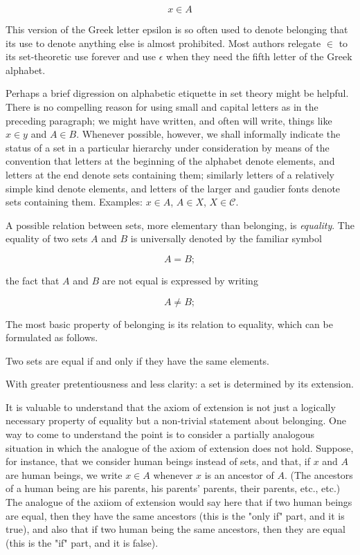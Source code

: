 \begin{equation*}
x \in A
\end{equation*}

This version of the Greek letter epsilon is so often used to denote belonging that its use to denote anything else is almost prohibited. Most authors relegate $\in$ to its set-theoretic use forever and use $\epsilon$ when they need the fifth letter of the Greek alphabet. 

Perhaps a brief digression on alphabetic etiquette in set theory might be helpful. There is no compelling reason for using small and capital letters as in the preceding paragraph; we might have written, and often will write, things like $x \in y$ and $A \in B$. Whenever possible, however, we shall informally indicate the status of a set in a particular hierarchy under consideration by means of the convention that letters at the beginning of the alphabet denote elements, and letters at the end denote sets containing them; similarly letters of a relatively simple kind denote elements, and letters of the larger and gaudier fonts denote sets containing them. Examples: $x \in A$, $A \in X$, $X \in \mathcal{C}$.


A possible relation between sets, more elementary than belonging, is \textit{equality}. The equality of two sets $A$ and $B$ is universally denoted by the familiar symbol 

\begin{equation*}
A = B;
\end{equation*}

the fact that $A$ and $B$ are not equal is expressed by writing 

\begin{equation*}
A \neq B;
\end{equation*}

The most basic property of belonging is its relation to equality, which can be formulated as follows. 

\begin{named} Two sets are equal if and only if they have the same elements.
\end{named}

With greater pretentiousness and less clarity: a set is determined by its extension. 

It is valuable to understand that the axiom of extension is not just a logically necessary property of equality but a non-trivial statement about belonging. One way to come to understand the point is to consider a partially analogous situation in which the analogue of the axiom of extension does not hold. Suppose, for instance, that we consider human beings instead of sets, and that, if $x$ and $A$ are human beings, we write $x \in A$ whenever $x$ is an ancestor of $A$. (The ancestors of a human being are his parents, his parents' parents, their parents, etc., etc.) The analogue of the axiiom of extension would say here that if two human beings are equal, then they have the same ancestors (this is the "only if" part, and it is true), and also that if two human being the same ancestors, then they are equal (this is the "if" part, and it is false). 

